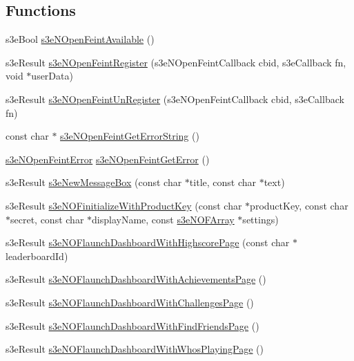 \subsection*{Functions}
\begin{DoxyCompactItemize}
\item 
s3eBool \hyperlink{group___n_open_feint_api_group_ga6b912a16b413186f3387e8e9a95bcb21}{s3eNOpenFeintAvailable} ()
\item 
s3eResult \hyperlink{group___n_open_feint_api_group_ga15c3278f021ef1cdbc4f2b522444cc90}{s3eNOpenFeintRegister} (s3eNOpenFeintCallback cbid, s3eCallback fn, void $\ast$userData)
\item 
s3eResult \hyperlink{group___n_open_feint_api_group_ga622ceda63aaf8c2c0765ee8a086dfe60}{s3eNOpenFeintUnRegister} (s3eNOpenFeintCallback cbid, s3eCallback fn)
\item 
const char $\ast$ \hyperlink{group___n_open_feint_api_group_gabc6fcbf5fbde609504975831ecb9e801}{s3eNOpenFeintGetErrorString} ()
\item 
\hyperlink{group___n_open_feint_api_group_ga6ef9ed4c26e06a1b4d5b3d0004ea28bd}{s3eNOpenFeintError} \hyperlink{group___n_open_feint_api_group_ga1547aacf4dfcb626c1d5515d91916106}{s3eNOpenFeintGetError} ()
\item 
s3eResult \hyperlink{group___n_open_feint_api_group_gac4da11b85d70897f15745ecd1c65949d}{s3eNewMessageBox} (const char $\ast$title, const char $\ast$text)
\item 
s3eResult \hyperlink{group___n_open_feint_api_group_gab565578b04e0056a8ce477a9b848a94c}{s3eNOFinitializeWithProductKey} (const char $\ast$productKey, const char $\ast$secret, const char $\ast$displayName, const \hyperlink{structs3e_n_o_f_array}{s3eNOFArray} $\ast$settings)
\item 
s3eResult \hyperlink{group___n_open_feint_api_group_ga3084c8f351d1545f33bad15e0bfce0d8}{s3eNOFlaunchDashboardWithHighscorePage} (const char $\ast$leaderboardId)
\item 
s3eResult \hyperlink{group___n_open_feint_api_group_ga10d29137246b18a6b0aa0f14190eafc8}{s3eNOFlaunchDashboardWithAchievementsPage} ()
\item 
s3eResult \hyperlink{group___n_open_feint_api_group_ga298064bb113bc28f0f11dfa88f261ffe}{s3eNOFlaunchDashboardWithChallengesPage} ()
\item 
s3eResult \hyperlink{group___n_open_feint_api_group_gac88efb584c9cbff3820ceb68266bfede}{s3eNOFlaunchDashboardWithFindFriendsPage} ()
\item 
s3eResult \hyperlink{group___n_open_feint_api_group_ga0eb2d1ae58ac7f05315dd0d4166e9793}{s3eNOFlaunchDashboardWithWhosPlayingPage} ()

\end{DoxyCompactItemize}
